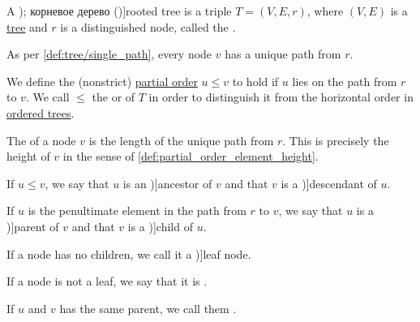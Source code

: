 \begin{definition}\label{def:rooted_tree}
  A \term[ru=ориентированное дерево (\cite[323]{ЕмеличевИПр1990ТеорияГрафов}); корневое дерево (\cite[\S 9.2.1]{Новиков2013ДискретнаяМатематика})]{rooted tree} is a triple \( T = (V, E, r) \), where \( (V, E) \) is a \hyperref[def:tree]{tree} and \( r \) is a distinguished node, called the .

  As per \cref{def:tree/single_path}, every node \( v \) has a unique path from \( r \).

  \begin{thmenum}
     We define the (nonstrict) \hyperref[def:partially_ordered_set]{partial order} \( u \leq v \) to hold if \( u \) lies on the path from \( r \) to \( v \). We call \( \leq \) the  or  of \( T \) in order to distinguish it from the horizontal order in \hyperref[def:ordered_tree]{ordered trees}.

     The  of a node \( v \) is the length of the unique path from \( r \). This is precisely the height of \( v \) in the sense of \cref{def:partial_order_element_height}.

     If \( u \leq v \), we say that \( u \) is an \term[ru=предок (\cite[298]{БелоусовТкачёв2004ДискретнаяМатематика})]{ancestor} of \( v \) and that \( v \) is a \term[ru=потомок (\cite[298]{БелоусовТкачёв2004ДискретнаяМатематика})]{descendant} of \( u \).

     If \( u \) is the penultimate element in the path from \( r \) to \( v \), we say that \( u \) is a \term[ru=отец (\cite[298]{БелоусовТкачёв2004ДискретнаяМатематика})]{parent} of \( v \) and that \( v \) is a \term[ru=сын (\cite[298]{БелоусовТкачёв2004ДискретнаяМатематика})]{child} of \( u \).

     If a node has no children, we call it a \term[ru=лист (\cite[298]{БелоусовТкачёв2004ДискретнаяМатематика})]{leaf node}.

     If a node is not a leaf, we say that it is .

     If \( u \) and \( v \) has the same parent, we call them .
  \end{thmenum}


\end{definition}
